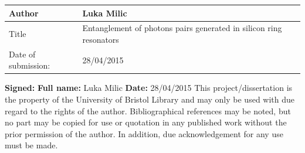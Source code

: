 \documentclass[11pt]{article}
\numberwithin{equation}{section}
\numberwithin{figure}{section}
\begin{document}
\begin{table}[h]
\begin{tabular}{|l|l|l|}
\hline
Author              & Luka Milic                                                         \\ \hline
Title               & Entanglement of photons pairs generated in silicon ring resonators \\ \hline
Date of submission: & 28/04/2015                                                         \\ \hline
\end{tabular}
\end{table}
\noindent
\textbf{Signed:}
\newline
\textbf{Full name:} Luka Milic
\newline
\textbf{Date:} 28/04/2015
\newline
\newline
This project/dissertation is the property of the University of Bristol Library and may only be used with due regard
to the rights of the author. Bibliographical references may be noted, but no part may be copied for use or
quotation in any published work without the prior permission of the author. In addition, due acknowledgement
for any use must be made.


\newpage
\tableofcontents
\newpage






\newpage
%


\newpage
\appendix 




\end{document}
